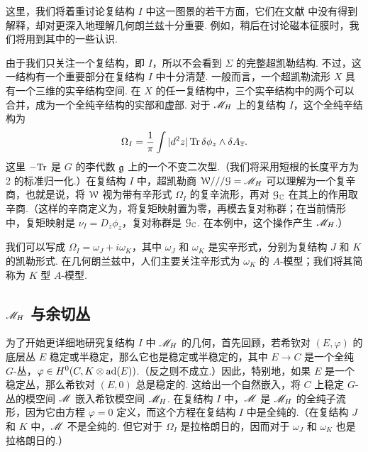 这里，我们将着重讨论复结构 $I$ 中这一图景的若干方面，它们在文献 \cite{KW} 中没有得到解释，却对更深入地理解几何朗兰兹十分重要. 例如，稍后在讨论磁本征膜时，我们将用到其中的一些认识.

由于我们只关注一个复结构，即 $I$，所以不会看到 $\Sigma$ 的完整超凯勒结构. 不过，这一结构有一个重要部分在复结构 $I$ 中十分清楚. 一般而言，一个超凯勒流形 $X$ 具有一个三维的实辛结构空间. 在 $X$ 的任一复结构中，三个实辛结构中的两个可以合并，成为一个全纯辛结构的实部和虚部. 对于 $\MH$ 上的复结构 $I$，这个全纯辛结构为
\begin{equation}\label{zolk}\Omega_I=\frac{1}{\pi}\int |d ^2z|\,\Tr\,\delta\phi_z\wedge\delta A_{\bar z}. \end{equation}
这里 $-\Tr$ 是 $G$ 的李代数 $\frak g$ 上的一个不变二次型.（我们将采用短根的长度平方为 2 的标准归一化.）在复结构 $I$ 中，超凯勒商 $\CW///\G=\MH$ 可以理解为一个复辛商，也就是说，将 $\CW$ 视为带有辛形式 $\Omega_I$ 的复辛流形，再对 $\G_\C$ 在其上的作用取辛商.（这样的辛商定义为，将复矩映射置为零，再模去复对称群；在当前情形中，复矩映射是 $\nu_I=D_{\bar z}\phi_z$，复对称群是 $\G_\C$. 在本例中，这个操作产生 $\MH$.）

我们可以写成 $\Omega_I=\omega_J+i\omega_K$，其中 $\omega_J$ 和 $\omega_K$ 是实辛形式，分别为复结构 $J$ 和 $K$ 的凯勒形式. 在几何朗兰兹中，人们主要关注辛形式为 $\omega_K$ 的 $A$-模型；我们将其简称为 $K$ 型 $A$-模型.

\subsection{$\MH$ 与余切丛}
\label{hitchfib}

为了开始更详细地研究复结构 $I$ 中 $\MH$ 的几何，首先回顾，若希钦对 $(E,\varphi)$ 的底层丛 $E$ 稳定或半稳定，那么它也是稳定或半稳定的，其中 $E\to C$ 是一个全纯 $G$-丛，$\varphi\in H^0(C,K\otimes\ade)$.（反之则不成立.）因此，特别地，如果 $E$ 是一个稳定丛，那么希钦对 $(E,0)$ 总是稳定的. 这给出一个自然嵌入，将 $C$ 上稳定 $G$-丛的模空间 $\M$ 嵌入希钦模空间 $\MH$. 在复结构 $I$ 中，$\M$ 是 $\MH$ 的全纯子流形，因为它由方程 $\varphi=0$ 定义，而这个方程在复结构 $I$ 中是全纯的.（在复结构 $J$ 和 $K$ 中，$\M$ 不是全纯的. 但它对于 $\Omega_I$ 是拉格朗日的，因而对于 $\omega_J$ 和 $\omega_K$ 也是拉格朗日的.）

